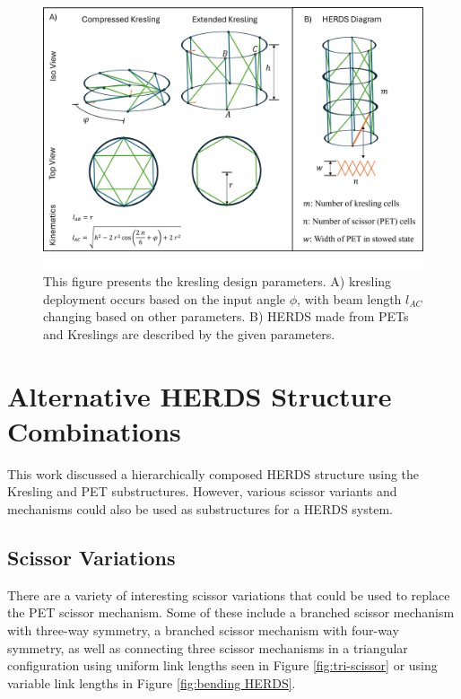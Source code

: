 \documentclass[11pt, a4paper]{article}
\begin{document}
\begin{figure}[ht]
\centering
\includegraphics[width=\linewidth]{figures-sup/Kresling relations.png}

\centering
\caption{This figure presents the kresling design parameters. A) kresling deployment occurs based on the input angle $\phi$, with beam length $l_{AC}$ changing based on other parameters. B) HERDS made from PETs and Kreslings are described by the given parameters.}
\label{fig:Kres_parameters}
\end{figure}

\section{Alternative HERDS Structure Combinations}
This work discussed a hierarchically composed HERDS structure using the Kresling and PET substructures. However, various scissor variants and mechanisms could also be used as substructures for a HERDS system.  
\subsection{Scissor Variations}
There are a variety of interesting scissor variations that could be used to replace the PET scissor mechanism. Some of these include a branched scissor mechanism with three-way symmetry,  a branched scissor mechanism with four-way symmetry, as well as connecting three scissor mechanisms in a triangular configuration using uniform link lengths seen in Figure \ref{fig:tri-scissor} or using variable link lengths in Figure \ref{fig:bending HERDS}.
\end{document}
